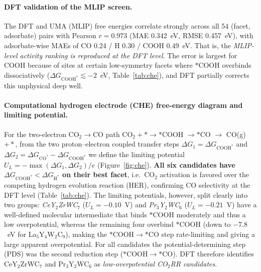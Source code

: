 \documentclass[11pt,a4paper]{report}
\newcommand{\dGCO}{\Delta G_{\mathrm{CO^*}}}
\newcommand{\dGH}{\Delta G_{\mathrm{H^*}}}
\newcommand{\dGCOOH}{\Delta G_{\mathrm{COOH^*}}}
\begin{document}
\paragraph{DFT validation of the MLIP screen.} The DFT and UMA (MLIP) free energies correlate strongly across all 54 (facet, adsorbate)
pairs with Pearson $r=0.973$ (MAE 0.342~eV, RMSE 0.457~eV), with adsorbate-wise MAEs of CO 0.24 /
H 0.30 / COOH 0.49~eV. That is, the \emph{MLIP-level activity ranking is reproduced at the DFT level}. The error is largest for COOH
because of sites at certain low-symmetry facets where $*$COOH overbinds dissociatively ($\dGCOOH \lesssim -2$~eV,
Table~\ref{tab:che}), and DFT partially corrects this unphysical deep well.

\paragraph{Computational hydrogen electrode (CHE) free-energy diagram and limiting potential.} For the two-electron CO$_2\!\to\!$CO path
CO$_2+* \to *$COOH $\to *$CO $\to$ CO(g)$+*$, from the two proton--electron coupled transfer steps
$\Delta G_1=\dGCOOH$ and $\Delta G_2=\dGCO-\dGCOOH$ we define the limiting potential $U_L=-\max(\Delta G_1,\Delta G_2)/e$
(Figure~\ref{fig:che}). \textbf{All six candidates have $\dGCOOH<\dGH$ on their best facet}, i.e.\ CO$_2$
activation is favored over the competing hydrogen evolution reaction (HER), confirming CO selectivity at the DFT level
(Table~\ref{tab:che}). The limiting potentials, however, split clearly into two groups: \emph{CeY$_2$ZrWC$_7$} ($U_L=-0.10$~V) and
\emph{Pr$_3$Y$_2$WC$_6$} ($U_L=-0.21$~V) have a well-defined molecular intermediate that binds $*$COOH moderately and thus a low
overpotential, whereas the remaining four overbind $*$COOH (down to $-7.8$~eV for La$_5$Y$_4$W$_2$C$_9$), making the
$*$COOH$\to*$CO step rate-limiting and giving a large apparent overpotential. For all candidates the potential-determining step (PDS) was
the second reduction step ($*$COOH$\to*$CO). DFT therefore identifies CeY$_2$ZrWC$_7$ and Pr$_3$Y$_2$WC$_6$ as
\emph{low-overpotential CO$_2$RR candidates}.
\end{document}
